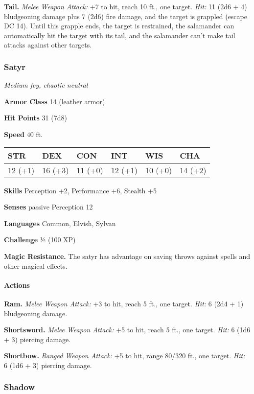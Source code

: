 \documentclass[
]{article}
\begin{document}
\textbf{Tail.} \emph{Melee Weapon Attack:} +7 to hit, reach 10 ft., one
target. \emph{Hit:} 11 (2d6 + 4) bludgeoning damage plus 7 (2d6) fire
damage, and the target is grappled (escape DC 14). Until this grapple
ends, the target is restrained, the salamander can automatically hit the
target with its tail, and the salamander can't make tail attacks against
other targets.

\hypertarget{satyr}{%
\subsubsection{Satyr}\label{satyr}}

\emph{Medium fey, chaotic neutral}

\textbf{Armor Class} 14 (leather armor)

\textbf{Hit Points} 31 (7d8)

\textbf{Speed} 40 ft.

\begin{longtable}[]{@{}llllll@{}}
\toprule
STR & DEX & CON & INT & WIS & CHA\tabularnewline
\midrule
\endhead
12 (+1) & 16 (+3) & 11 (+0) & 12 (+1) & 10 (+0) & 14 (+2)\tabularnewline
\bottomrule
\end{longtable}

\textbf{Skills} Perception +2, Performance +6, Stealth +5

\textbf{Senses} passive Perception 12

\textbf{Languages} Common, Elvish, Sylvan

\textbf{Challenge} ½ (100 XP)

\textbf{Magic Resistance.} The satyr has advantage on saving throws
against spells and other magical effects.

\hypertarget{actions-2}{%
\paragraph{Actions}\label{actions-2}}

\textbf{Ram.} \emph{Melee Weapon Attack:} +3 to hit, reach 5 ft., one
target. \emph{Hit:} 6 (2d4 + 1) bludgeoning damage.

\textbf{Shortsword.} \emph{Melee Weapon Attack:} +5 to hit, reach 5 ft.,
one target. \emph{Hit:} 6 (1d6 + 3) piercing damage.

\textbf{Shortbow.} \emph{Ranged Weapon Attack:} +5 to hit, range 80/320
ft., one target. \emph{Hit:} 6 (1d6 + 3) piercing damage.

\hypertarget{shadow}{%
\subsubsection{Shadow}\label{shadow}}
\end{document}
